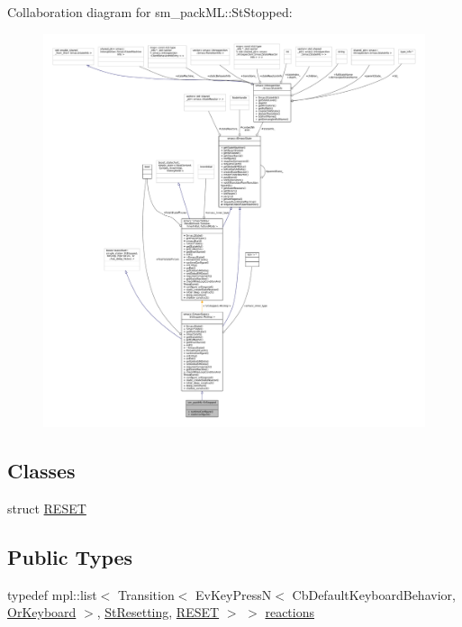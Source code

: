 Collaboration diagram for sm\+\_\+pack\+ML\+:\+:St\+Stopped\+:
\nopagebreak
\begin{figure}[H]
\begin{center}
\leavevmode
\includegraphics[width=350pt]{structsm__packML_1_1StStopped__coll__graph}
\end{center}
\end{figure}
\subsection*{Classes}
\begin{DoxyCompactItemize}
\item 
struct \hyperlink{structsm__packML_1_1StStopped_1_1RESET}{R\+E\+S\+ET}
\end{DoxyCompactItemize}
\subsection*{Public Types}
\begin{DoxyCompactItemize}
\item 
typedef mpl\+::list$<$ Transition$<$ Ev\+Key\+PressN$<$ Cb\+Default\+Keyboard\+Behavior, \hyperlink{classsm__packML_1_1OrKeyboard}{Or\+Keyboard} $>$, \hyperlink{structsm__packML_1_1StResetting}{St\+Resetting}, \hyperlink{structsm__packML_1_1StStopped_1_1RESET}{R\+E\+S\+ET} $>$ $>$ \hyperlink{structsm__packML_1_1StStopped_aabf80c9d33d70267864a8f17c2813aa7}{reactions}
\end{DoxyCompactItemize}
